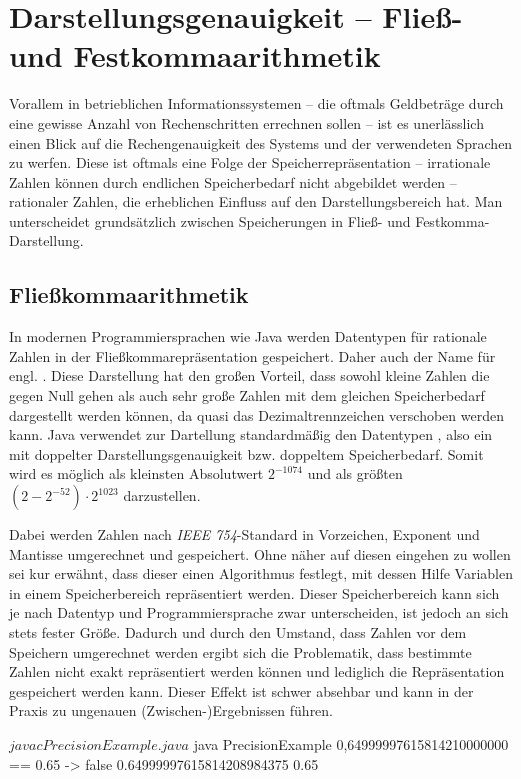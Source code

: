 \section{Darstellungsgenauigkeit -- Fließ- und Festkommaarithmetik}
Vorallem in betrieblichen Informationssystemen -- die oftmals Geldbeträge durch eine gewisse Anzahl von Rechenschritten errechnen sollen -- ist es unerlässlich einen Blick auf die Rechengenauigkeit des Systems und der verwendeten Sprachen zu werfen. Diese ist oftmals eine Folge der Speicherrepräsentation -- irrationale Zahlen können durch endlichen Speicherbedarf nicht abgebildet werden -- rationaler Zahlen, die erheblichen Einfluss auf den Darstellungsbereich hat. Man unterscheidet grundsätzlich zwischen Speicherungen in Fließ- und Festkomma-Darstellung.
 
\subsection*{Fließkommaarithmetik}
In modernen Programmiersprachen wie Java werden Datentypen für rationale Zahlen in der Fließkommarepräsentation gespeichert. Daher auch der Name  für engl. . Diese Darstellung hat den großen Vorteil, dass sowohl kleine Zahlen die gegen Null gehen als auch sehr große Zahlen mit dem gleichen Speicherbedarf dargestellt werden können, da quasi das Dezimaltrennzeichen verschoben werden kann. Java verwendet zur Dartellung standardmäßig den Datentypen , also ein  mit doppelter Darstellungsgenauigkeit bzw. doppeltem Speicherbedarf. Somit wird es möglich als kleinsten Absolutwert $2^{-1074}$ und als größten $(2 - 2^{-52}) \cdot 2^{1023}$ darzustellen.

Dabei werden Zahlen nach \textit{IEEE 754}-Standard in Vorzeichen, Exponent und Mantisse umgerechnet und gespeichert. Ohne näher auf diesen eingehen zu wollen sei kur erwähnt, dass dieser einen Algorithmus festlegt, mit dessen Hilfe Variablen in einem Speicherbereich repräsentiert werden. Dieser Speicherbereich kann sich je nach Datentyp und Programmiersprache zwar unterscheiden, ist jedoch an sich stets fester Größe. Dadurch und durch den Umstand, dass Zahlen vor dem Speichern umgerechnet werden ergibt sich die Problematik, dass bestimmte Zahlen nicht exakt repräsentiert werden können und lediglich die  Repräsentation gespeichert werden kann. Dieser Effekt ist schwer absehbar und kann in der Praxis zu ungenauen (Zwischen-)Ergebnissen führen.

\sepCodeAndOutputCheck
\begin{shellwindow}
$ javac PrecisionExample.java 
$ java PrecisionExample
0,64999997615814210000000 == 0.65 -> false
0.64999997615814208984375
0.65
\end{shellwindow}

